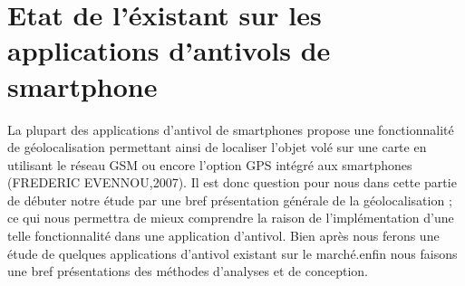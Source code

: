 \documentclass[a4paper, 12pt]{article}
\begin{document}
\section{Etat de l'éxistant sur les applications d'antivols de smartphone}

\quad La plupart des applications d’antivol de smartphones propose une fonctionnalité de géolocalisation permettant ainsi de localiser l’objet volé sur une carte en utilisant le réseau GSM ou encore l’option GPS intégré aux smartphones (FREDERIC EVENNOU,2007). Il est donc question pour nous dans cette partie de débuter notre étude par une bref présentation générale de la géolocalisation ; ce qui nous permettra de mieux comprendre la raison de l’implémentation d’une telle fonctionnalité
dans une application d’antivol. Bien après nous ferons une étude de quelques applications d’antivol existant sur le marché.enfin nous faisons une bref présentations des méthodes d'analyses et de conception.
\newline
\end{document}
